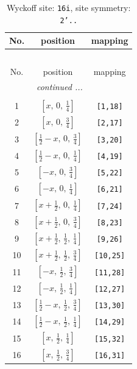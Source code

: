 \documentclass[fleqn,8pt]{jsarticle}
\begin{document}
\renewcommand{\arraystretch}{1.2}
\begin{longtable}{ccc}
\caption{Wyckoff site: {\tt 16i}, site symmetry: {\tt 2'..}}
 \\
 \hline \hline
No. & position & mapping \\ \hline \endfirsthead

\multicolumn{2}{l}{\tablename\ \thetable{}} \\
 \hline \hline
No. & position & mapping \\ \hline \endhead

 \hline \hline
\multicolumn{2}{r}{\footnotesize\it continued ...} \\ \endfoot

 \hline \hline
\multicolumn{2}{r}{} \\ \endlastfoot

1 & $\left[ x,\, 0,\, \frac{1}{4} \right]$ & {\tt [1,18]} \\ \hline
2 & $\left[ x,\, 0,\, \frac{3}{4} \right]$ & {\tt [2,17]} \\ \hline
3 & $\left[ \frac{1}{2} - x,\, 0,\, \frac{3}{4} \right]$ & {\tt [3,20]} \\ \hline
4 & $\left[ \frac{1}{2} - x,\, 0,\, \frac{1}{4} \right]$ & {\tt [4,19]} \\ \hline
5 & $\left[ - x,\, 0,\, \frac{3}{4} \right]$ & {\tt [5,22]} \\ \hline
6 & $\left[ - x,\, 0,\, \frac{1}{4} \right]$ & {\tt [6,21]} \\ \hline
7 & $\left[ x + \frac{1}{2},\, 0,\, \frac{1}{4} \right]$ & {\tt [7,24]} \\ \hline
8 & $\left[ x + \frac{1}{2},\, 0,\, \frac{3}{4} \right]$ & {\tt [8,23]} \\ \hline
9 & $\left[ x + \frac{1}{2},\, \frac{1}{2},\, \frac{1}{4} \right]$ & {\tt [9,26]} \\ \hline
10 & $\left[ x + \frac{1}{2},\, \frac{1}{2},\, \frac{3}{4} \right]$ & {\tt [10,25]} \\ \hline
11 & $\left[ - x,\, \frac{1}{2},\, \frac{3}{4} \right]$ & {\tt [11,28]} \\ \hline
12 & $\left[ - x,\, \frac{1}{2},\, \frac{1}{4} \right]$ & {\tt [12,27]} \\ \hline
13 & $\left[ \frac{1}{2} - x,\, \frac{1}{2},\, \frac{3}{4} \right]$ & {\tt [13,30]} \\ \hline
14 & $\left[ \frac{1}{2} - x,\, \frac{1}{2},\, \frac{1}{4} \right]$ & {\tt [14,29]} \\ \hline
15 & $\left[ x,\, \frac{1}{2},\, \frac{1}{4} \right]$ & {\tt [15,32]} \\ \hline
16 & $\left[ x,\, \frac{1}{2},\, \frac{3}{4} \right]$ & {\tt [16,31]} \\
\end{longtable}
\end{document}
